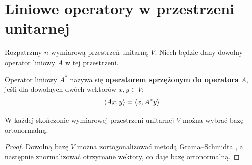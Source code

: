 \section{Liniowe operatory w przestrzeni unitarnej}

Rozpatrzmy $n$-wymiarową przestrzeń unitarną $V$. Niech będzie dany dowolny operator liniowy $A$ w tej przestrzeni.

\begin{definition}
    Operator liniowy $A^*$ nazywa się \textbf{operatorem sprzężonym do operatora} $A$, jeśli dla dowolnych dwóch wektorów $x, y \in V$:
    \begin{equation}\label{eq:def_conjugated_operator}
        \left\langle Ax, y \right\rangle = \left\langle x, A^*y \right\rangle
    \end{equation}
\end{definition}
\begin{lemma}\label{lemma:existing_of_ortonormal_base}
W każdej skończonie wymiarowej przestrzeni unitarnej $V$ można wybrać bazę ortonormalną.
\end{lemma}   
\begin{proof}
    Dowolną bazę $V$ można zortogonalizować metodą Grama–Schmidta \cite[s. 140--142]{mostowski1977}, a następnie znormalizować otrzymane wektory, co daje bazę ortonormalną.
\end{proof}

